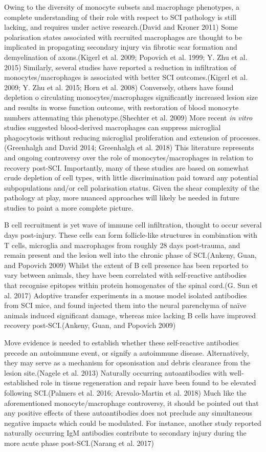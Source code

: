 \documentclass[9pt,lineno]{elife}
\begin{document}
Owing to the diversity of monocyte subsets and macrophage phenotypes, a complete understanding of their role with respect to SCI pathology is still lacking, and requires under active research.(David and Kroner 2011)
Some polarisation states associated with recruited macrophages are thought to be implicated in propagating secondary injury via fibrotic scar formation and demyelination of axons.(Kigerl et al. 2009; Popovich et al. 1999; Y. Zhu et al. 2015)
Similarly, several studies have reported a reduction in infiltration of monocytes/macrophages is associated with better SCI outcomes.(Kigerl et al. 2009; Y. Zhu et al. 2015; Horn et al. 2008)
Conversely, others have found depletion o circulating monocytes/macrophages significantly increased lesion size and results in worse function outcome, with restoration of blood monocyte numbers attenuating this phenotype.(Shechter et al. 2009)
More recent \emph{in vitro} studies suggested blood-derived macrophages can suppress microglial phagocytosis without reducing microglial proliferation and extension of processes.(Greenhalgh and David 2014; Greenhalgh et al. 2018)
This literature represents and ongoing controversy over the role of monocytes/macrophages in relation to recovery post-SCI.
Importantly, many of these studies are based on somewhat crude depletion of cell types, with little discrimination paid toward any potential subpopulations and/or cell polarisation status.
Given the shear complexity of the pathology at play, more nuanced approaches will likely be needed in future studies to paint a more complete picture.

B cell recruitment is yet wave of immune cell infiltration, thought to occur several days post-injury.
These cells can form follicle-like structures in combination with T cells, microglia and macrophages from roughly 28 days post-trauma, and remain present and the lesion well into the chronic phase of SCI.(Ankeny, Guan, and Popovich 2009)
Whilst the extent of B cell presence has been reported to vary between animals, they have been correlated with self-reactive antibodies that recognise epitopes within protein homogenates of the spinal cord.(G. Sun et al. 2017)
Adoptive transfer experiments in a mouse model isolated antibodies from SCI mice, and found injected them into the neural parenchyma of naïve animals induced significant damage, whereas mice lacking B cells have improved recovery post-SCI.(Ankeny, Guan, and Popovich 2009)

Move evidence is needed to establish whether these self-reactive antibodies precede an autoimmune event, or signify a autoimmune disease.
Alternatively, they may serve as a mechanism for opsonisation and debris clearance from the lesion site.(Nagele et al. 2013)
Naturally occurring autoantibodies with well-established role in tissue regeneration and repair have been found to be elevated following SCI.(Palmers et al. 2016; Arevalo-Martin et al. 2018)
Much like the aforementioned monocyte/macrophage controversy, it should be pointed out that any positive effects of these autoantibodies does not preclude any simultaneous negative impacts which could be modulated.
For instance, another study reported naturally occurring IgM antibodies contribute to secondary injury during the more acute phase post-SCI.(Narang et al. 2017)
\end{document}
